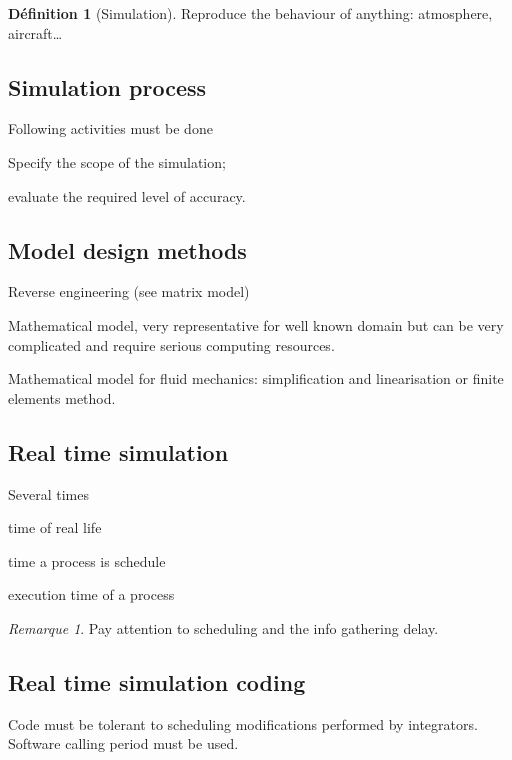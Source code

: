 \documentclass[10pt]{article}
\theoremstyle{plain}
\theoremstyle{definition}
\newtheorem{defn}{Définition}
\theoremstyle{remark}
\newtheorem{rem}{Remarque}
\begin{document}
\begin{defn}
	[Simulation]
	Reproduce the behaviour of anything: atmosphere, aircraft\dots
\end{defn}

\subsection{Simulation process}
Following activities must be done
\begin{compactitem}
	\item Specify the scope of the simulation;
	\item evaluate the required level of accuracy.
\end{compactitem}

\subsection{Model design methods}
\begin{compactitem}
	\item Reverse engineering (see matrix model)
	\item Mathematical model, very representative for well known domain but can
		be very complicated and require serious computing resources.
	\item Mathematical model for fluid mechanics: simplification and
		linearisation or finite elements method.
\end{compactitem}

\subsection{Real time simulation}
Several times
\begin{compactitem}
	\item time of real life
	\item time a process is schedule
	\item execution time of a process
\end{compactitem}
\begin{rem}
	Pay attention to scheduling and the info gathering delay.
\end{rem}

\subsection{Real time simulation coding}
Code must be tolerant to scheduling modifications performed by integrators.
Software calling period must be used.
\end{document}
